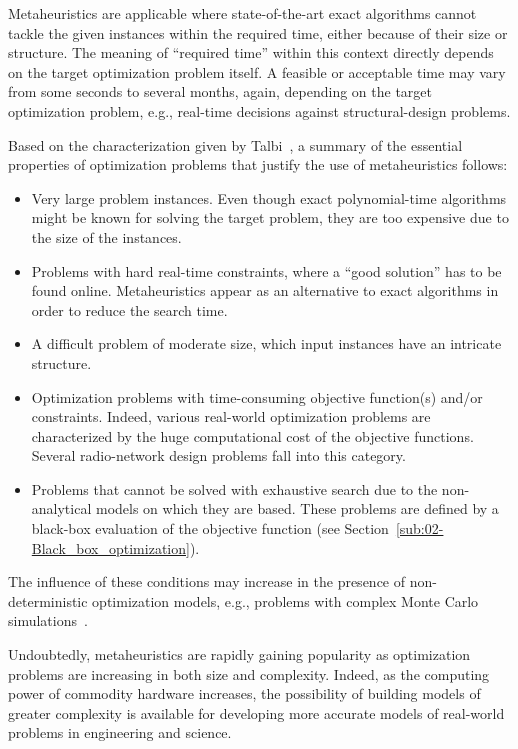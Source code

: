 Metaheuristics are applicable where state-of-the-art exact algorithms
cannot tackle the given instances within the required time, either
because of their size or structure. The meaning of ``required time''
within this context directly depends on the target optimization problem
itself. A feasible or acceptable time may vary from some seconds to
several months, again, depending on the target optimization problem,
e.g., real-time decisions against structural-design problems.

Based on the characterization given by Talbi~\cite{Talbi_Metaheuristics:2009},
a summary of the essential properties of optimization problems that
justify the use of metaheuristics follows:
\begin{itemize}
\item Very large problem instances. Even though exact polynomial-time algorithms
might be known for solving the target problem, they are too expensive
due to the size of the instances.
\item Problems with hard real-time constraints, where a ``good solution''
has to be found online. Metaheuristics appear as an alternative to
exact algorithms in order to reduce the search time.
\item A difficult problem of moderate size, which input instances have an
intricate structure.
\item Optimization problems with time-consuming objective function(s) and/or
constraints. Indeed, various real-world optimization problems are
characterized by the huge computational cost of the objective functions.
Several radio-network design problems fall into this category.
\item Problems that cannot be solved with exhaustive search due to the non-analytical
models on which they are based. These problems are defined by a black-box
evaluation of the objective function (see Section~\ref{sub:02-Black_box_optimization}).
\end{itemize}
The influence of these conditions may increase in the presence of
non-deterministic optimization models, e.g., problems with complex
Monte Carlo simulations~\cite{Creutz-Microcanonincal_monte_carlo_simulation:1983}.

Undoubtedly, metaheuristics are rapidly gaining popularity as optimization
problems are increasing in both size and complexity. Indeed, as the
computing power of commodity hardware increases, the possibility of
building models of greater complexity is available for developing
more accurate models of real-world problems in engineering and science.

